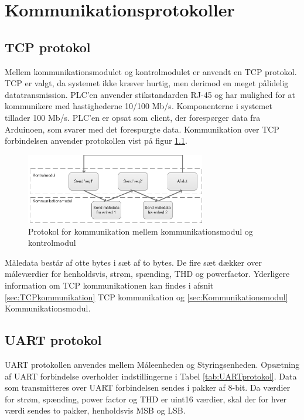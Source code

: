 
\chapter{Kommunikationsprotokoller}
\label{ch:KomProtokol}

\section{TCP protokol}
\label{sec:TCPprotokol}
Mellem kommunikationsmodulet og kontrolmodulet er anvendt en TCP protokol. TCP er valgt, da systemet ikke kræver hurtig, men derimod en meget pålidelig datatransmission. PLC'en anvender stikstandarden RJ-45 og har mulighed for at kommunikere med hastighederne 10/100 Mb/s. Komponenterne i systemet tillader 100 Mb/s.
PLC'en er opsat som client, der forespørger data fra Arduinoen, som svarer med det forespurgte data. Kommunikation over TCP forbindelsen anvender protokollen vist på figur \ref{fig:TCPprotokol}.

\begin{figure}[H] %
	\centering
	\includegraphics[width=0.7\textwidth]{Figure/TCPprotokol}
	\caption{Protokol for kommunikation mellem kommunikationsmodul og kontrolmodul}
	\label{fig:TCPprotokol}
\end{figure}

Måledata består af otte bytes i sæt af to bytes. De fire sæt dækker over måleværdier for henholdsvis, strøm, spænding, THD og powerfactor. Yderligere information om TCP kommunikationen kan findes i afsnit \ref{sec:TCPkommunikation} TCP kommunikation og \ref{sec:Kommunikationsmodul} Kommunikationsmodul.

\section{UART protokol}
\label{sec:UARTprotokol}
UART protokollen anvendes mellem Måleenheden og Styringsenheden. Opsætning af UART forbindelse overholder indstillingerne i Tabel \ref{tab:UARTprotokol}. Data som transmitteres over UART forbindelsen sendes i pakker af 8-bit. Da værdier for strøm, spænding, power factor og THD er uint16 værdier, skal der for hver værdi sendes to pakker, henholdsvis MSB og LSB. 


